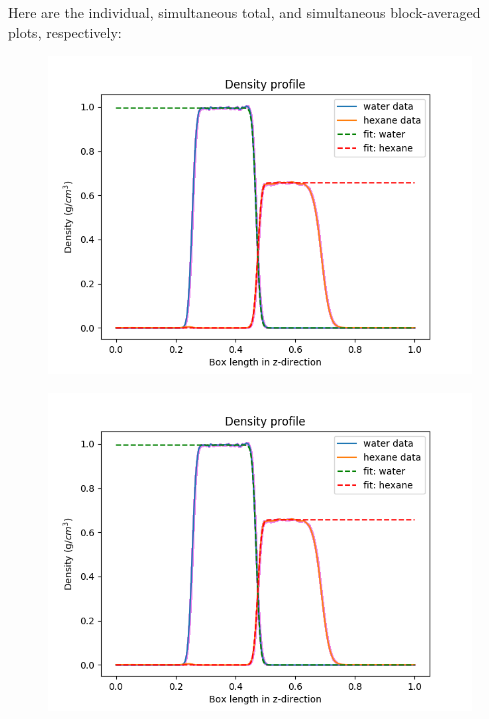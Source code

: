 \documentclass[12pt,reqno]{amsart}
\numberwithin{equation}{section}
\begin{document}
\begin{enumerate}
Here are the individual, simultaneous total, and simultaneous block-averaged plots, respectively: 

\begin{figure}[H]
\centering
\includegraphics[scale=0.6]{interface_density_profile_individualfit_NVTprod-1bead}
\end{figure}

\begin{figure}[H]
\centering
\includegraphics[scale=0.6]{interface_density_profile_simultaneousfit_NVTprod-1bead}
\end{figure}


\end{enumerate}
\end{document}
